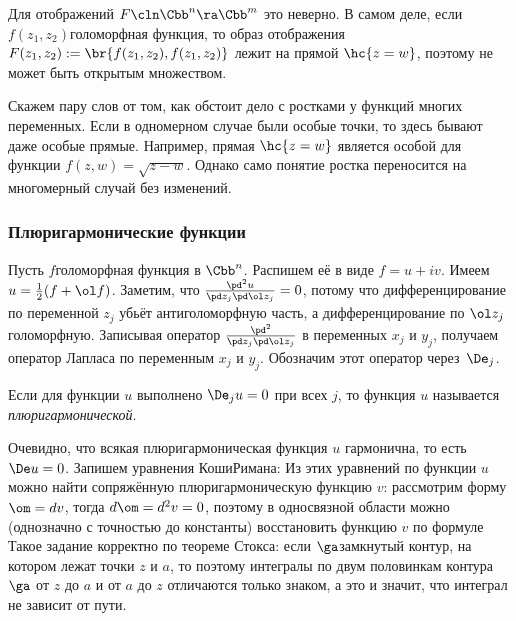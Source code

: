 \documentclass[a4paper]{article}
\begin{document}
\begin{note}
Для отображений $F\cln \Cbb^n \ra \Cbb^m$ это неверно. В самом деле, если $f(z_1,z_2)$\т голоморфная функция,
то образ отображения $F(z_1,z_2) := \br{f(z_1,z_2),f(z_1,z_2)}$ лежит на прямой $\hc{z = w}$, поэтому
не может быть открытым множеством.
\end{note}

\medskip

Скажем пару слов от том, как обстоит дело с ростками у функций многих переменных.
Если в одномерном случае были особые точки, то здесь бывают даже особые прямые. Например, прямая $\hc{z = w}$
является особой для функции $f(z,w) = \sqrt{z - w}$. Однако само понятие ростка переносится на
многомерный случай без изменений.

\subsubsection{Плюригармонические функции}

Пусть $f$\т голоморфная функция в $\Cbb^n$. Распишем её в виде $f = u + iv$.
Имеем $u = \frac12(f + \ol f)$. Заметим, что
$\frac{\pd^2u}{\pd z_j \pd \ol z_j} = 0$, потому что дифференцирование по переменной $z_j$
убьёт антиголоморфную часть, а дифференцирование по $\ol z_j$\т голоморфную. Записывая оператор
$\frac{\pd^2}{\pd z_j \pd \ol z_j}$ в переменных $x_j$ и $y_j$, получаем оператор Лапласа по
переменным $x_j$ и $y_j$. Обозначим этот оператор через~$\De_j$.

\begin{df}
Если для функции $u$ выполнено $\De_j u = 0$ при всех $j$, то функция $u$ называется
\emph{плюригармонической}.
\end{df}

Очевидно, что всякая плюригармоническая функция $u$ гармонична, то есть $\De u = 0$.
Запишем уравнения Коши\ч Римана:
Из этих уравнений по функции $u$ можно найти сопряжённую плюригармоническую функцию $v$:
рассмотрим форму $\om = dv$, тогда $d\om = d^2v = 0$, поэтому в односвязной области можно
(однозначно с точностью до константы) восстановить функцию $v$ по формуле
Такое задание корректно по теореме Стокса: если $\ga$\т замкнутый контур, на котором
лежат точки $z$ и $a$, то
поэтому интегралы по двум половинкам контура $\ga$ от $z$ до $a$ и от $a$ до $z$ отличаются
только знаком, а это и значит, что интеграл не зависит от пути.
\end{document}
